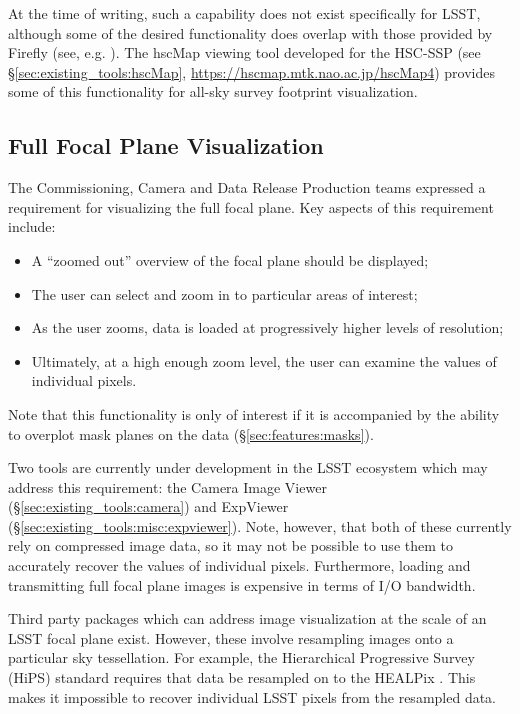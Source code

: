 At the time of writing, such a capability does not exist specifically for LSST, although some of the desired functionality does overlap with those provided by Firefly (see, e.g. \citep{2016AAS...22734806D}).  The hscMap viewing tool developed for the HSC-SSP (see \S\ref{sec:existing_tools:hscMap}, \url{https://hscmap.mtk.nao.ac.jp/hscMap4}) provides some of this functionality for all-sky survey footprint visualization.

\subsection{Full Focal Plane Visualization}
\label{sec:features:focal_plane}

The Commissioning, Camera and Data Release Production teams expressed a requirement for visualizing the full focal plane.
Key aspects of this requirement include:

\begin{itemize}

  \item{A ``zoomed out'' overview of the focal plane should be displayed;}
  \item{The user can select and zoom in to particular areas of interest;}
  \item{As the user zooms, data is loaded at progressively higher levels of resolution;}
  \item{Ultimately, at a high enough zoom level, the user can examine the values of individual pixels.}

\end{itemize}

Note that this functionality is only of interest if it is accompanied by the ability to overplot mask planes on the data (\S\ref{sec:features:masks}).

Two tools are currently under development in the LSST ecosystem which may address this requirement: the Camera Image Viewer (\S\ref{sec:existing_tools:camera}) and ExpViewer (\S\ref{sec:existing_tools:misc:expviewer}).
Note, however, that both of these currently rely on compressed image data, so it may not be possible to use them to accurately recover the values of individual pixels.
Furthermore, loading and transmitting full focal plane images is expensive in terms of I/O bandwidth.

Third party packages which can address image visualization at the scale of an LSST focal plane exist.
However, these involve resampling images onto a particular sky tessellation.
For example, the Hierarchical Progressive Survey (HiPS) standard \citep{2017ivoa.spec.0519F} requires that data be resampled on to the HEALPix \citep{gor05}.
This makes it impossible to recover individual LSST pixels from the resampled data.

